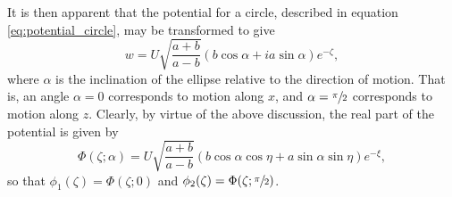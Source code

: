It is then apparent that the potential for a circle, described in equation \eqref{eq:potential_circle}, may be transformed to give
\begin{equation}\label{eq:potential_ellipse}
w = U\sqrt{\frac{a + b}{a - b}} (b \cos{\alpha} + i a \sin{\alpha}) e^{-\zeta},
\end{equation}
where $\alpha$ is the inclination of the ellipse relative to the direction of motion.
That is, an angle $\alpha = 0$ corresponds to motion along $x$, and $\alpha = \sfrac{\pi}{2}$ corresponds to motion along $z$.
Clearly, by virtue of the above discussion, the real part of the potential is given by
\[
\Phi(\zeta; \alpha) = U \sqrt{\frac{a + b}{a - b}} (b\cos{\alpha} \cos{\eta} + a \sin{\alpha} \sin{\eta}) e^{-\xi},
\]
so that $\phi_1 (\zeta) = \Phi(\zeta; 0)$ and $\phi_2 (\zeta) = \Phi(\zeta; \sfrac{\pi}{2})$.
